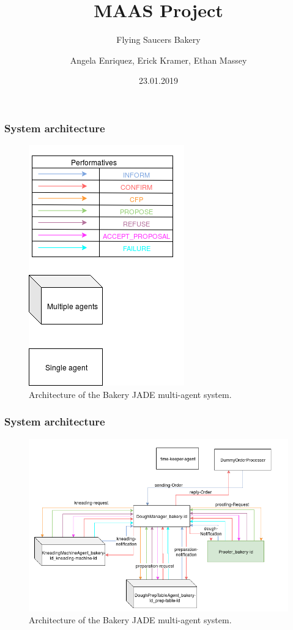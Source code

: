 \documentclass{beamer}
\author[Enriquez, Kramer, Massey]{Angela Enriquez, Erick Kramer, Ethan Massey}
\title{MAAS Project}
\subtitle{Flying Saucers Bakery}
\institute[HBRS]{Hochschule Bonn-Rhein-Sieg}
\date{23.01.2019}
\begin{document}
	
		\begin{frame}
			\titlepage
		\end{frame}
		
		\begin{frame}
			\frametitle{System architecture}
			\begin{figure}
				\centering
				\includegraphics[scale=0.4]{images/conventions.png}
				\caption{Architecture of the Bakery JADE multi-agent system.}
				\label{fig:architecture}
			\end{figure}
		\end{frame}
		
		\begin{frame}
			\frametitle{System architecture}
			\begin{figure}\vspace{-1cm}
				\centering
				\includegraphics[scale=0.4]{images/doughStage.png}
				\caption{Architecture of the Bakery JADE multi-agent system.}
				\label{fig:architecture}
			\end{figure}
		\end{frame}
		
\end{document}
